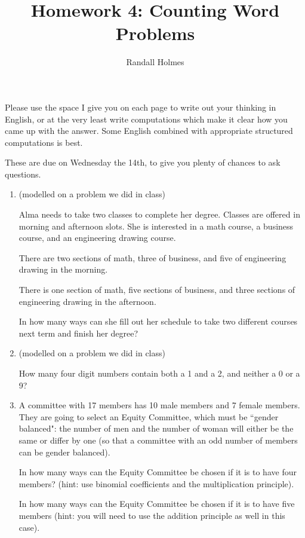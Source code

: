 \documentclass[12pt]{article}
\title{Homework 4:  Counting Word Problems}
\author{Randall Holmes}
\begin{document}
\maketitle

Please use the space I give you on each page to write out your thinking in English, or at the very least write computations which make it clear how you came up with the answer.  Some English combined with appropriate structured computations is best.

These are due on Wednesday the 14th, to give you plenty of chances to ask questions.

\newpage

\begin{enumerate}

\item (modelled on a problem we did in class)

Alma needs to take two classes to complete her degree.  Classes are offered in morning and afternoon slots.  She is interested in a math course, a business course, and an engineering drawing course.

There are two sections of math, three of business, and five of engineering drawing in the morning.

There is one section of math, five sections of business, and three sections of engineering drawing in the afternoon.

In how many ways can she fill out her schedule to take two different courses next term and finish her degree?

\newpage

\item (modelled on a problem we did in class)

How many four digit numbers contain both a 1 and a 2, and neither a 0 or a 9?

\newpage

\item  A committee with 17 members has 10 male members and 7 female members.  They are going to select an Equity Committee, which must be ``gender balanced":  the number of men and the number of woman will either be the same or differ by one (so that a committee with an odd number of members can be gender balanced).

In how many ways can the Equity Committee be chosen if it is to have four members?  (hint:  use binomial coefficients and the multiplication principle).

In how many ways can the Equity Committee be chosen if it is to have five members (hint: you will need to use the addition principle as well in this case).


\end{enumerate}
\end{document}
